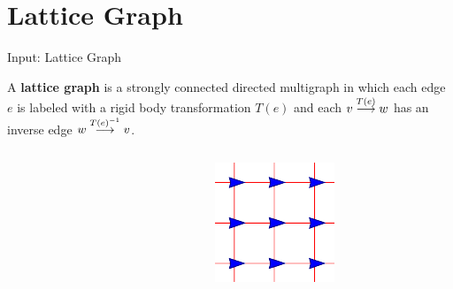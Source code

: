 \section{Lattice Graph}
\begin{frame}{Input: Lattice Graph}
  \begin{definition}
    A \textbf{lattice graph} is a strongly connected directed
      multigraph in which each edge $e$ is labeled with a rigid body
      transformation $T(e)$ and each ${v}\overset{T(e)}{\longrightarrow}{w}$ has an
      inverse edge ${w}\overset{T(e)^{-1}}{\longrightarrow}{v}$.  
    \end{definition}
    \begin{columns}[T] %
      \begin{column}{.45\textwidth}
        \begin{figure}
          \centering
        \end{figure}
      \end{column}%
      \begin{column}{.45\textwidth}
        \begin{figure}
          \centering
          \includegraphics[scale=1]{figs/squarelattice}
        \end{figure}
      \end{column}%
    \end{columns}
\end{frame}
